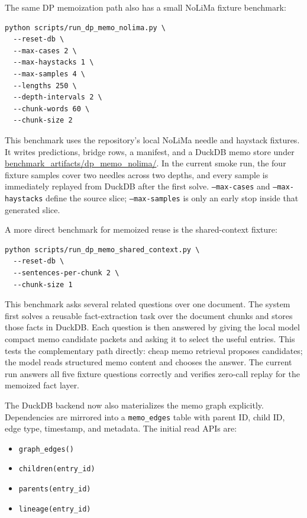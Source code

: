 \documentclass[11pt]{article}
\begin{document}
The same DP memoization path also has a small NoLiMa fixture benchmark:

\begin{verbatim}
python scripts/run_dp_memo_nolima.py \
  --reset-db \
  --max-cases 2 \
  --max-haystacks 1 \
  --max-samples 4 \
  --lengths 250 \
  --depth-intervals 2 \
  --chunk-words 60 \
  --chunk-size 2
\end{verbatim}

This benchmark uses the repository's local NoLiMa needle and haystack fixtures.
It writes predictions, bridge rows, a manifest, and a DuckDB memo store under
\url{benchmark_artifacts/dp_memo_nolima/}. In the current smoke run, the
four fixture samples cover two needles across two depths, and every sample is
immediately replayed from DuckDB after the first solve.
\texttt{--max-cases} and \texttt{--max-haystacks} define the source slice;
\texttt{--max-samples} is only an early stop inside that generated slice.

A more direct benchmark for memoized reuse is the shared-context fixture:

\begin{verbatim}
python scripts/run_dp_memo_shared_context.py \
  --reset-db \
  --sentences-per-chunk 2 \
  --chunk-size 1
\end{verbatim}

This benchmark asks several related questions over one document. The system
first solves a reusable fact-extraction task over the document chunks and stores
those facts in DuckDB. Each question is then answered by giving the local model
compact memo candidate packets and asking it to select the useful entries. This
tests the complementary path directly: cheap memo retrieval proposes candidates;
the model reads structured memo content and chooses the answer. The current run
answers all five fixture questions correctly and verifies zero-call replay for
the memoized fact layer.

The DuckDB backend now also materializes the memo graph explicitly.
Dependencies are mirrored into a \texttt{memo\_edges} table with parent ID,
child ID, edge type, timestamp, and metadata. The initial read APIs are:

\begin{itemize}[leftmargin=*]
    \item \texttt{graph\_edges()}
    \item \texttt{children(entry\_id)}
    \item \texttt{parents(entry\_id)}
    \item \texttt{lineage(entry\_id)}
\end{itemize}
\end{document}
